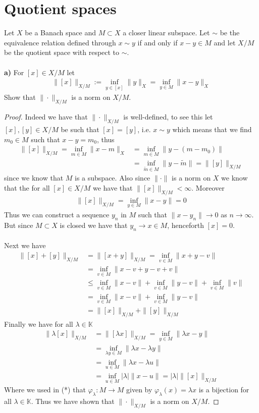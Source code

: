 \documentclass[12pt,a4paper]{article}
\author{Marco Bertenghi}
\theoremstyle{definition}
\begin{document}
\section{Quotient spaces}
Let $X$ be a Banach space and $M \subset X$ a closer linear subspace. Let $\sim$ be the equivalence relation defined through $x \sim y$ if and only if $x-y \in M$ and let $X/M$ be the quotient space with respect to $\sim.$
\\\\
\textbf{a)} For $[x] \in X/M$ let 
\begin{align*}
\|[x]\|_{X/M}:= \inf_{y \in [x]} \| y \|_X = \inf_{y \in M} \|x-y\|_X
\end{align*}
Show that $\| \cdot \|_{X/M}$ is a norm on $X/M$. 
\begin{proof}
Indeed we have that $\| \cdot \|_{X/M}$ is well-defined, to see this let $[x],[y] \in X/M$ be such that $[x]=[y]$, i.e. $x \sim y$ which means that we find $m_0 \in M$ such that $x-y=m_0$, thus
\begin{align*}
\|[x]\|_{X/M} = \inf_{m \in M} \|x -m \|_X &= \inf_{m \in M} \| y-(m-m_0)\| \\ & = \inf_{\tilde{m} \in M} \| y- \tilde{m}\| = \|[y]\|_{X/M}
\end{align*}
since we know that $M$ is a subspace. Also since $\| \cdot \|$ is a norm on $X$ we know that the for all $[x] \in X/M$ we have that $\|[x]\|_{X/M} < \infty$. Moreover
\begin{align*}
\| [x]\|_{X/M} = \inf_{y \in M} \|x-y\| = 0
\end{align*}
Thus we can construct a sequence $y_n$ in  $M$ such that $\|x-y_n\| \to 0 $ as $n \to \infty$. But since $M \subset X$ is closed we have that $y_n \to x \in M$, henceforth $[x]=0$. 
\\\\
Next we have
\begin{align*}
\| [x] + [y]\|_{X/M} &= \| [x+y]\|_{X/M} = \inf_{v \in M} \| x+y-v\| \\
&= \inf_{v \in M} \| x-v + y-v + v\| \\ 
& \leq \inf_{v \in M} \| x-v\| + \inf_{v \in M} \|y-v\| + \inf_{v \in M} \|v\| \\
& = \inf_{v \in M} \|x-v\| + \inf_{v \in M} \|y-v\|   \\
& 
= \| [x]\|_{X/M} + \|[y]\|_{X/M} 
\end{align*}
Finally we have for all $\lambda \in \mathbb{K}$
\begin{align*}
\| \lambda [x]\|_{X/M} &=  \|[ \lambda x] \|_{X/M} = \inf_{y \in M} \| \lambda x -y\|  \\
& = \inf_{ \lambda y  \in M} \| \lambda x - \lambda y\| \\
&= \inf_{u \in M} \| \lambda x - \lambda u\| \tag{*} \\
 & = \inf_{u \in M} | \lambda | \|x-u\| = | \lambda | \| [x] \|_{X/M} 
\end{align*}
 Where we used in (*) that $\varphi_\lambda : M \to M$ given by $ \varphi_\lambda(x)= \lambda x$ is a bijection for all $\lambda \in \mathbb{K}$. Thus we have shown that $\| \cdot \|_{X/M}$ is a norm on $X/M$. 
\end{proof}
\end{document}
